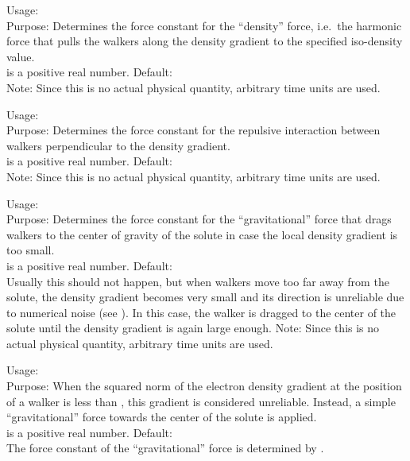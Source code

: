 {
  \noindent
  Usage:   \\[1.0ex] 
  Purpose: Determines the force constant  
    for the ``density'' force, i.e.~the harmonic force 
    that pulls the walkers along the density gradient 
    to the specified iso-density value. \\[1.0ex]
   is a positive real number. Default:  \\
}
Note: Since this is no actual physical quantity, arbitrary 
time units are used. 

{
  \noindent
  Usage:   \\[1.0ex] 
  Purpose: Determines the force constant  
    for the repulsive interaction between walkers 
    perpendicular to the density gradient. \\[1.0ex]
   is a positive real number. Default:  \\
}
Note: Since this is no actual physical quantity, arbitrary 
time units are used. 

{
  \noindent
  Usage:   \\[1.0ex] 
  Purpose: Determines the force constant  
    for the ``gravitational'' force that drags walkers to the 
    center of gravity of the solute in case the local 
    density gradient is too small. \\[1.0ex]
   is a positive real number. Default:  \\
}
Usually this should not happen, but when walkers move too 
far away from the solute, the density gradient becomes 
very small and its direction is unreliable due to numerical 
noise (see ).
In this case, the walker is dragged to the center of the 
solute until the density gradient is again large enough. 
Note: Since this is no actual physical quantity, arbitrary 
time units are used. 

{
  \noindent
  Usage:  
     \\[1.0ex] 
  Purpose: When the squared norm of the electron density 
    gradient at the position of a walker is less than 
    , this gradient is considered unreliable. 
    Instead, a simple ``gravitational'' force towards the 
    center of the solute is applied. \\[1.0ex]
   is a positive real number. 
    Default:  \\
}
The force constant of the ``gravitational'' force is 
determined by .


